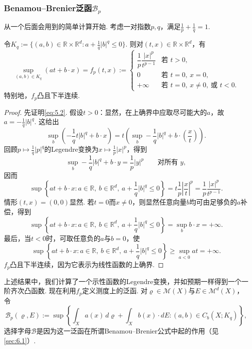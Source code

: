 \subsubsection[Benamou--Brenier泛函]{Benamou--Brenier泛函$\mathscr B_p$}\label{sec:5.3.1}

从一个后面会用到的简单计算开始. 考虑一对指数$p,q$，满足$\frac1p+\frac1q=1$.

\begin{lemma}\label{obj:5.17}
令$K_q:=\{(a,b)\in\mathbb R\times\mathbb R^d:a+\frac1q|b|^q\le0\}$. 则对$(t,x)\in\mathbb R\times\mathbb R^d$，有
\begin{equation}\label{eq:5.2}
\sup_{(a,b)\in K_q}(at+b\cdot x)=f_p(t,x):=
\begin{cases}
\dfrac1p\dfrac{|x|^p}{t^{p-1}}&\text{若 }t>0,\\
0&\text{若 }t=0,\ x=0,\\
+\infty&\text{若 }t=0,\ x\ne0,\ \text{或 }t<0.
\end{cases}
\end{equation}
特别地，$f_p$凸且下半连续.
\end{lemma}
\begin{proof}
先证明\eqref{eq:5.2}. 假设$t>0$：显然，在上确界中应取尽可能大的$a$，故$a=-\frac1q|b|^q$. 这给出
\[
\sup_b\left(-\frac1q t|b|^q+b\cdot x\right)
=t\left(\sup_b-\frac1q|b|^q+b\cdot\left(\frac xt\right)\right).
\]
回顾$p\mapsto\frac1q|p|^q$的Legendre变换为$x\mapsto\frac1p|x|^p$，得到
\begin{equation}\label{eq:5.3}
\sup_b-\frac1q|b|^q+b\cdot y=\frac1p|y|^p\qquad\text{对所有 }y,
\end{equation}
因而
\[
\sup\left\{at+b\cdot x:a\in\mathbb R,\ b\in\mathbb R^d,\ a+\frac1q|b|^q\le0\right\}
=t\frac1p\left|\frac xt\right|^p=\frac1p\frac{|x|^p}{t^{p-1}}.
\]
情形$(t,x)=(0,0)$显然. 若$t=0$而$x\ne0$，则显然任意向量$b$均可由足够负的$a$补偿，得到
\[
\sup\left\{at+b\cdot x:a\in\mathbb R,\ b\in\mathbb R^d,\ a+\frac1q|b|^q\le0\right\}
=\sup_b b\cdot x=+\infty.
\]
最后，当$t<0$时，可取任意负的$a$与$b=0$，使
\[
\sup\left\{at+b\cdot x:a\in\mathbb R,\ b\in\mathbb R^d,\ a+\frac1q|b|^q\le0\right\}
\ge\sup_{a<0}at=+\infty.
\]
$f_p$凸且下半连续，因为它表示为线性函数的上确界.
\end{proof}

上述结果中，我们计算了一个示性函数的Legendre变换，并如预期一样得到一个一阶齐次凸函数. 现在利用$f_p$定义测度上的泛函. 对$\varrho\in\mathscr M(X)$与$E\in\mathscr M^d(X)$，令
\[
\mathscr B_p(\varrho,E):=\sup\left\{\int_Xa(x)\,d\varrho+\int_Xb(x)\cdot dE:
(a,b)\in C_b(X;K_q)\right\},
\]
选择字母$\mathscr B$是因为这一泛函在所谓Benamou--Brenier公式中起的作用（见\autoref{sec:6.1}）.

